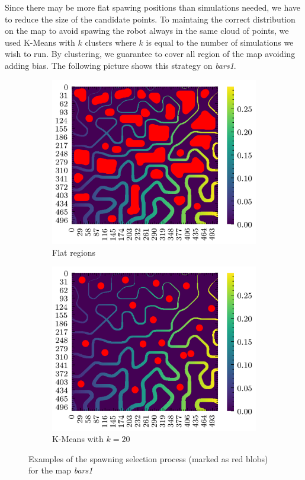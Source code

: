 \documentclass[../document.tex]{subfiles}
\begin{document}
Since there may be more flat spawing positions than simulations needed, we have to reduce the size of the candidate points. To maintaing the correct distribution on the map to avoid
spawing the robot always in the same cloud of points, we used K-Means with $k$ clusters where $k$ is equal to the number of simulations we wish to run. By clustering, we guarantee to cover all region of the map avoiding adding bias. The following picture shows this strategy on \emph{bars1}. 
\begin{figure}[H]
    \begin{subfigure}[b]{0.5\textwidth}
        \includegraphics[width=\textwidth]{../img/3/spawn/flat-spawn-10.png}
        \caption{Flat regions}
    \end{subfigure}
    \begin{subfigure}[b]{0.5\textwidth}
        \includegraphics[width=\textwidth]{../img/3/spawn/spawn-10.png}
        \caption{K-Means with $k=20$}
    \end{subfigure}  
\label{fig: spawn-strat}
\caption{Examples of the spawning selection process (marked as red blobs) for the map \emph{bars1} }   
\end{figure}
\end{document}
